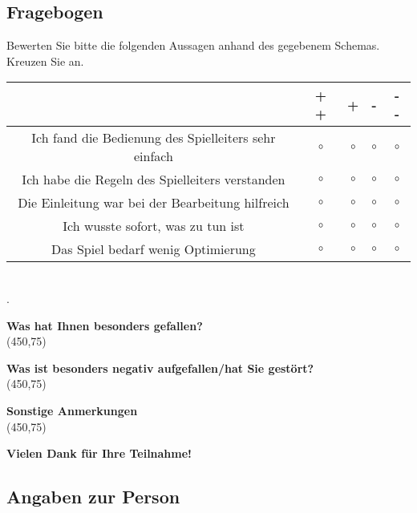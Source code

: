 \newpage

\subsection{Fragebogen}
Bewerten Sie bitte die folgenden Aussagen anhand des gegebenem Schemas. Kreuzen Sie an.
\begin{large}


\begin{tabular}{|c|c|c|c|c|}
\hline
& + + & + & - & - -\\
\hline
Ich fand die Bedienung des Spielleiters sehr einfach & $\circ$ & $\circ$ & $\circ$ & $\circ$ \\
\hline
Ich habe die Regeln des Spielleiters verstanden & $\circ$ & $\circ$ & $\circ$ & $\circ$ \\
\hline
Die Einleitung war bei der Bearbeitung hilfreich & $\circ$ & $\circ$ & $\circ$ & $\circ$ \\
\hline
Ich wusste sofort, was zu tun ist & $\circ$ & $\circ$ & $\circ$ & $\circ$ \\
\hline
Das Spiel bedarf wenig Optimierung & $\circ$ & $\circ$ & $\circ$ & $\circ$ \\
\hline
\end{tabular}\\.


\textbf{Was hat Ihnen besonders gefallen?}\\

\framebox(450,75){}

\textbf{Was ist besonders negativ aufgefallen/hat Sie gestört?}\\

\framebox(450,75){}

\textbf{Sonstige Anmerkungen}\\

\framebox(450,75){}

\begin{center}
\textbf{Vielen Dank für Ihre Teilnahme!}
\end{center}
\end{large}

\newpage

\subsection{Angaben zur Person}

